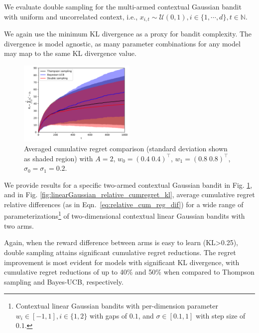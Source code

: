\documentclass{article}
\def \Natural{{\mathbb N}}
\newcommand{\ie}{i.e., }
\newcommand{\U}[1]{\mathcal{U}\left( #1\right)}
\begin{document}
We evaluate double sampling for the multi-armed contextual Gaussian bandit with uniform and uncorrelated context, \ie $x_{i,t}\sim \U{0,1}, i \in \{1, \cdots, d\}, t \in \Natural$. 

We again use the minimum KL divergence as a proxy for bandit complexity. The divergence is model agnostic, as many parameter combinations for any model may map to the same KL divergence value.

\begin{figure}[!h]
	\centering
	\includegraphics[width=0.5\textwidth]{./figs/linearGaussian/cumulative_regret.pdf}
	\caption{Averaged cumulative regret comparison (standard deviation shown as shaded region) with $A=2$, $w_0=(0.4 \; 0.4)^\top$, $w_1=(0.8 \; 0.8)^\top$, $\sigma_0=\sigma_1=0.2$.}
	\label{fig:linearGaussian_cumulative_regret_compare}
\end{figure}

We provide results for a specific two-armed contextual Gaussian bandit in Fig. \ref{fig:linearGaussian_cumulative_regret_compare}, and in Fig. \ref{fig:linearGaussian_relative_cumregret_kl}, average cumulative regret relative differences (as in Eqn.~\eqref{eq:relative_cum_reg_dif}) for a wide range of parameterizations\footnote{Contextual linear Gaussian bandits with per-dimension parameter $w_i \in [-1,1], i\in\{1,2\}$ with gaps of $0.1$, and $\sigma \in [0.1,1]$ with step size of $0.1$.} of two-dimensional contextual linear Gaussian bandits with two arms.

Again, when the reward difference between arms is easy to learn (KL>0.25), double sampling attains significant cumulative regret reductions. The regret improvement is most evident for models with significant KL divergence, with cumulative regret reductions of up to 40\% and 50\% when compared to Thompson sampling and Bayes-UCB, respectively.
\end{document}
